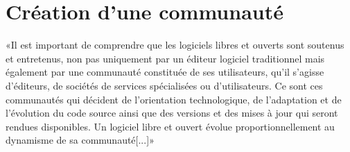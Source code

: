 



\section{Création d’une communauté}


«Il est important de comprendre que les logiciels libres et ouverts sont soutenus et entretenus, non pas uniquement par un éditeur logiciel traditionnel mais également par une communauté constituée de ses utilisateurs, qu'il s'agisse d'éditeurs, de sociétés de services spécialisées ou d'utilisateurs. Ce sont ces communautés qui décident de l'orientation technologique, de l'adaptation et de l'évolution du code source ainsi que des versions et des mises à jour qui seront rendues disponibles. Un logiciel libre et ouvert évolue proportionnellement au dynamisme de sa communauté[...]»~\cite{tresor_gouv_logiciels_libres}

